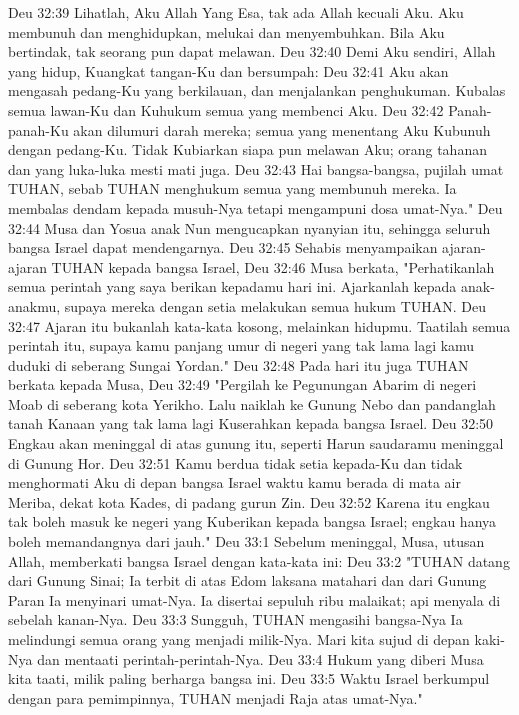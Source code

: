 Deu 32:39  Lihatlah, Aku Allah Yang Esa, tak ada Allah kecuali Aku. Aku membunuh dan menghidupkan, melukai dan menyembuhkan. Bila Aku bertindak, tak seorang pun dapat melawan.
Deu 32:40  Demi Aku sendiri, Allah yang hidup, Kuangkat tangan-Ku dan bersumpah:
Deu 32:41  Aku akan mengasah pedang-Ku yang berkilauan, dan menjalankan penghukuman. Kubalas semua lawan-Ku dan Kuhukum semua yang membenci Aku.
Deu 32:42  Panah-panah-Ku akan dilumuri darah mereka; semua yang menentang Aku Kubunuh dengan pedang-Ku. Tidak Kubiarkan siapa pun melawan Aku; orang tahanan dan yang luka-luka mesti mati juga.
Deu 32:43  Hai bangsa-bangsa, pujilah umat TUHAN, sebab TUHAN menghukum semua yang membunuh mereka. Ia membalas dendam kepada musuh-Nya tetapi mengampuni dosa umat-Nya."
Deu 32:44  Musa dan Yosua anak Nun mengucapkan nyanyian itu, sehingga seluruh bangsa Israel dapat mendengarnya.
Deu 32:45  Sehabis menyampaikan ajaran-ajaran TUHAN kepada bangsa Israel,
Deu 32:46  Musa berkata, "Perhatikanlah semua perintah yang saya berikan kepadamu hari ini. Ajarkanlah kepada anak-anakmu, supaya mereka dengan setia melakukan semua hukum TUHAN.
Deu 32:47  Ajaran itu bukanlah kata-kata kosong, melainkan hidupmu. Taatilah semua perintah itu, supaya kamu panjang umur di negeri yang tak lama lagi kamu duduki di seberang Sungai Yordan."
Deu 32:48  Pada hari itu juga TUHAN berkata kepada Musa,
Deu 32:49  "Pergilah ke Pegunungan Abarim di negeri Moab di seberang kota Yerikho. Lalu naiklah ke Gunung Nebo dan pandanglah tanah Kanaan yang tak lama lagi Kuserahkan kepada bangsa Israel.
Deu 32:50  Engkau akan meninggal di atas gunung itu, seperti Harun saudaramu meninggal di Gunung Hor.
Deu 32:51  Kamu berdua tidak setia kepada-Ku dan tidak menghormati Aku di depan bangsa Israel waktu kamu berada di mata air Meriba, dekat kota Kades, di padang gurun Zin.
Deu 32:52  Karena itu engkau tak boleh masuk ke negeri yang Kuberikan kepada bangsa Israel; engkau hanya boleh memandangnya dari jauh."
Deu 33:1  Sebelum meninggal, Musa, utusan Allah, memberkati bangsa Israel dengan kata-kata ini:
Deu 33:2  "TUHAN datang dari Gunung Sinai; Ia terbit di atas Edom laksana matahari dan dari Gunung Paran Ia menyinari umat-Nya. Ia disertai sepuluh ribu malaikat; api menyala di sebelah kanan-Nya.
Deu 33:3  Sungguh, TUHAN mengasihi bangsa-Nya Ia melindungi semua orang yang menjadi milik-Nya. Mari kita sujud di depan kaki-Nya dan mentaati perintah-perintah-Nya.
Deu 33:4  Hukum yang diberi Musa kita taati, milik paling berharga bangsa ini.
Deu 33:5  Waktu Israel berkumpul dengan para pemimpinnya, TUHAN menjadi Raja atas umat-Nya."
